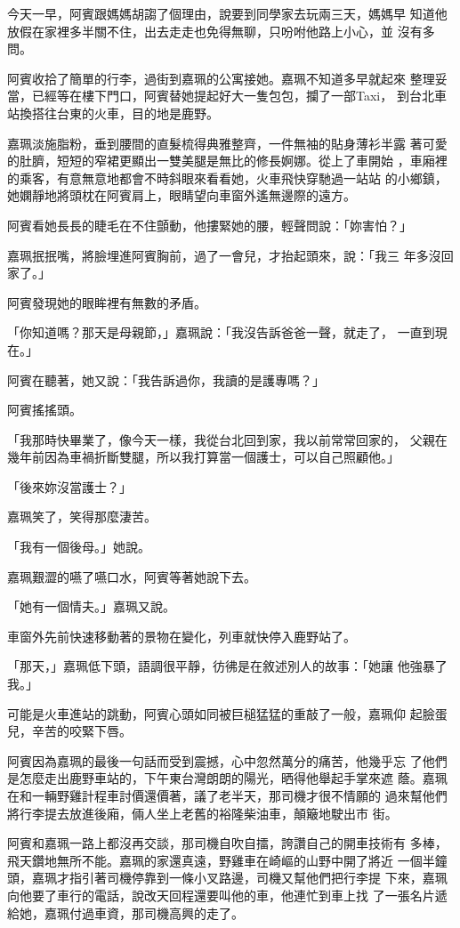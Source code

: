 今天一早，阿賓跟媽媽胡謅了個理由，說要到同學家去玩兩三天，媽媽早
知道他放假在家裡多半關不住，出去走走也免得無聊，只吩咐他路上小心，並
沒有多問。

阿賓收拾了簡單的行李，過街到嘉珮的公寓接她。嘉珮不知道多早就起來
整理妥當，已經等在樓下門口，阿賓替她提起好大一隻包包，攔了一部Taxi，
到台北車站換搭往台東的火車，目的地是鹿野。

嘉珮淡施脂粉，垂到腰間的直髮梳得典雅整齊，一件無袖的貼身薄衫半露
著可愛的肚臍，短短的窄裙更顯出一雙美腿是無比的修長婀娜。從上了車開始
，車廂裡的乘客，有意無意地都會不時斜眼來看看她，火車飛快穿馳過一站站
的小鄉鎮，她嫻靜地將頭枕在阿賓肩上，眼睛望向車窗外遙無邊際的遠方。

阿賓看她長長的睫毛在不住顫動，他摟緊她的腰，輕聲問說：「妳害怕？」

嘉珮抿抿嘴，將臉埋進阿賓胸前，過了一會兒，才抬起頭來，說：「我三
年多沒回家了。」

阿賓發現她的眼眸裡有無數的矛盾。

「你知道嗎？那天是母親節，」嘉珮說：「我沒告訴爸爸一聲，就走了，
一直到現在。」

阿賓在聽著，她又說：「我告訴過你，我讀的是護專嗎？」

阿賓搖搖頭。

「我那時快畢業了，像今天一樣，我從台北回到家，我以前常常回家的，
父親在幾年前因為車禍折斷雙腿，所以我打算當一個護士，可以自己照顧他。」

「後來妳沒當護士？」

嘉珮笑了，笑得那麼淒苦。

「我有一個後母。」她說。

嘉珮艱澀的嚥了嚥口水，阿賓等著她說下去。

「她有一個情夫。」嘉珮又說。

車窗外先前快速移動著的景物在變化，列車就快停入鹿野站了。

「那天，」嘉珮低下頭，語調很平靜，彷彿是在敘述別人的故事：「她讓
他強暴了我。」

可能是火車進站的跳動，阿賓心頭如同被巨槌猛猛的重敲了一般，嘉珮仰
起臉蛋兒，辛苦的咬緊下唇。

阿賓因為嘉珮的最後一句話而受到震撼，心中忽然萬分的痛苦，他幾乎忘
了他們是怎麼走出鹿野車站的，下午東台灣朗朗的陽光，晒得他舉起手掌來遮
蔭。嘉珮在和一輛野雞計程車討價還價著，議了老半天，那司機才很不情願的
過來幫他們將行李提去放進後廂，倆人坐上老舊的裕隆柴油車，顛簸地駛出市
街。

阿賓和嘉珮一路上都沒再交談，那司機自吹自擂，誇讚自己的開車技術有
多棒，飛天鑽地無所不能。嘉珮的家還真遠，野雞車在崎嶇的山野中開了將近
一個半鐘頭，嘉珮才指引著司機停靠到一條小叉路邊，司機又幫他們把行李提
下來，嘉珮向他要了車行的電話，說改天回程還要叫他的車，他連忙到車上找
了一張名片遞給她，嘉珮付過車資，那司機高興的走了。

